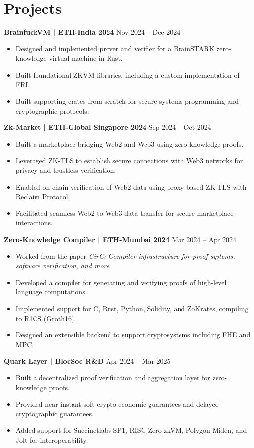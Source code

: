 \documentclass[11pt,a4paper]{article}
\newcommand{\resumeSubheading}[4]{
  \textbf{#1} \hfill #2\\
  \textit{#3} \hfill \textit{#4}
}
\begin{document}
\section*{Projects}
\resumeSubheading{BrainfuckVM | ETH-India 2024}{Nov 2024 -- Dec 2024}{}{}
\begin{itemize}
  \item Designed and implemented prover and verifier for a BrainSTARK zero-knowledge virtual machine in Rust.
  \item Built foundational ZKVM libraries, including a custom implementation of FRI.
  \item Built supporting crates from scratch for secure systems programming and cryptographic protocols.
\end{itemize}

\resumeSubheading{Zk-Market | ETH-Global Singapore 2024}{Sep 2024 -- Oct 2024}{}{}
\begin{itemize}
  \item Built a marketplace bridging Web2 and Web3 using zero-knowledge proofs.
  \item Leveraged ZK-TLS to establish secure connections with Web3 networks for privacy and trustless verification.
  \item Enabled on-chain verification of Web2 data using proxy-based ZK-TLS with Reclaim Protocol.
  \item Facilitated seamless Web2-to-Web3 data transfer for secure marketplace interactions.
\end{itemize}

\resumeSubheading{Zero-Knowledge Compiler | ETH-Mumbai 2024}{Mar 2024 -- Apr 2024}{}{}
\begin{itemize}
  \item Worked from the paper \textit{CirC: Compiler infrastructure for proof systems, software verification, and more}.
  \item Developed a compiler for generating and verifying proofs of high-level language computations.
  \item Implemented support for C, Rust, Python, Solidity, and ZoKrates, compiling to R1CS (Groth16).
  \item Designed an extensible backend to support cryptosystems including FHE and MPC.
\end{itemize}

\resumeSubheading{Quark Layer | BlocSoc R\&D}{Apr 2024 -- Mar 2025}{}{}
\begin{itemize}
  \item Built a decentralized proof verification and aggregation layer for zero-knowledge proofs.
  \item Provided near-instant soft crypto-economic guarantees and delayed cryptographic guarantees.
  \item Added support for Succinctlabs SP1, RISC Zero zkVM, Polygon Miden, and Jolt for interoperability.
\end{itemize}
\end{document}
